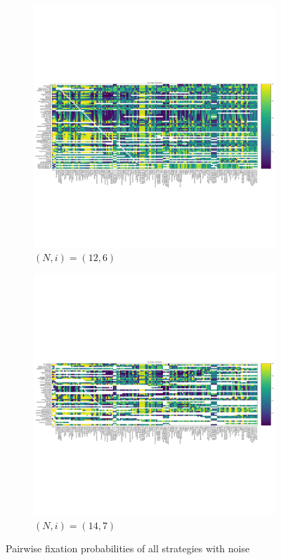 \documentclass{article}
\begin{document}
\begin{figure}[!hbtp]
\begin{subfigure}[t]{.3\textwidth}
        \centering
        \includegraphics[width=.8\textwidth]{../img/fixation_heatmap_12_6_noise.pdf}
        \caption{\((N,i)=(12, 6)\)}
    \end{subfigure}%

    \begin{subfigure}[t]{.3\textwidth}
        \centering
        \includegraphics[width=.8\textwidth]{../img/fixation_heatmap_14_7_noise.pdf}
        \caption{\((N,i)=(14, 7)\)}
    \end{subfigure}%
    \caption{Pairwise fixation probabilities of all strategies with noise}
    \label{fig:fixation_heatmap_n_over_2_noise}
\end{figure}
\end{document}
